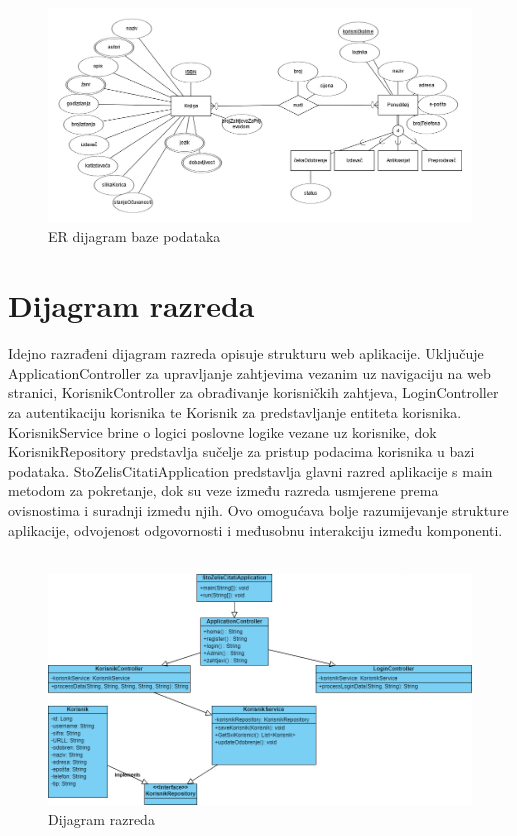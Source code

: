 				\begin{figure}[H]
					\includegraphics[width=\textwidth]{dijagrami/baza_ERmod_v2.PNG} %
					\centering
					\caption{ER dijagram baze podataka}
					\label{fig:arh2}
				\end{figure}
				
			
			\eject
			
			
		\section{Dijagram razreda} 
			
			Idejno razrađeni dijagram razreda opisuje strukturu web aplikacije. Uključuje ApplicationController za upravljanje zahtjevima vezanim uz navigaciju na web stranici, KorisnikController za obrađivanje korisničkih zahtjeva, LoginController za autentikaciju korisnika te Korisnik za predstavljanje entiteta korisnika. KorisnikService brine o logici poslovne logike vezane uz korisnike, dok KorisnikRepository predstavlja sučelje za pristup podacima korisnika u bazi podataka. StoZelisCitatiApplication predstavlja glavni razred aplikacije s main metodom za pokretanje, dok su veze između razreda usmjerene prema ovisnostima i suradnji između njih. Ovo omogućava bolje razumijevanje strukture aplikacije, odvojenost odgovornosti i međusobnu interakciju između komponenti. \\ \\
			
				\begin{figure}[H]
				\includegraphics[width=\textwidth]{dijagrami/ClassDiagram1.PNG} %
				\centering
				\caption{Dijagram razreda}
				\label{fig:razred1}
			\end{figure}
			
